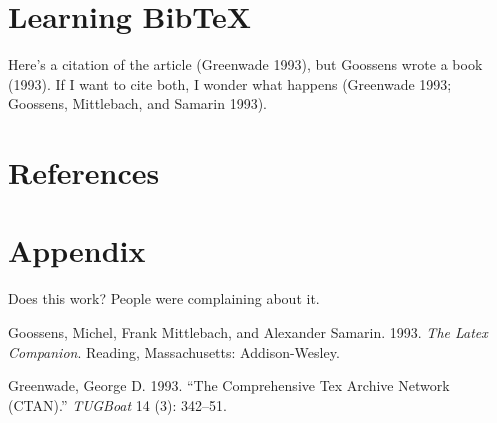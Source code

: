 \documentclass[]{article}
\begin{document}
\section{Learning BibTeX}\label{learning-bibtex}

Here's a citation of the article (Greenwade 1993), but Goossens wrote a
book (1993). If I want to cite both, I wonder what happens (Greenwade
1993; Goossens, Mittlebach, and Samarin 1993).

\section{References}\label{references}

\section{Appendix}\label{appendix}

Does this work? People were complaining about it.

Goossens, Michel, Frank Mittlebach, and Alexander Samarin. 1993.
\emph{The Latex Companion}. Reading, Massachusetts: Addison-Wesley.

Greenwade, George D. 1993. ``The Comprehensive Tex Archive Network
(CTAN).'' \emph{TUGBoat} 14 (3): 342--51.
\end{document}
